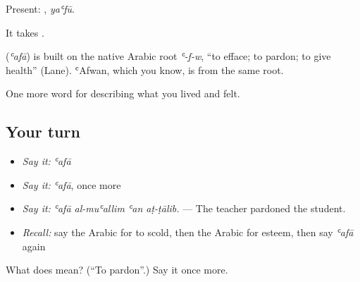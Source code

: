 Present: , \emph{yaʿfū}.

It takes .

\begin{cousinweb}
\textbf{} (\emph{ʿafā}) is built on the native Arabic root \emph{ʿ-f-w}, \textquotedblleft{}to efface; to pardon; to give health\textquotedblright{} (Lane). ʿAfwan, which you know, is from the same root.
\end{cousinweb}

\begin{grammarlens}[title={What you've built}]
One more word for describing what you lived and felt.
\end{grammarlens}

\subsection*{Your turn}
\begin{itemize}
\raggedright
  \item \emph{Say it:} \emph{ʿafā}
  \item \emph{Say it:} \emph{ʿafā}, once more
  \item \emph{Say it:} \emph{ʿafā al-muʿallim ʿan aṭ-ṭālib.} — The teacher pardoned the student.
  \item \emph{Recall:} say the Arabic for to scold, then the Arabic for esteem, then say \emph{ʿafā} again
\end{itemize}

\begin{tcolorbox}[breakable,colback=teal!4,colframe=teal!35!black,title={Before you move on}]
What does  mean? (\textquotedblleft{}To pardon\textquotedblright{}.) Say it once more.
\end{tcolorbox}
